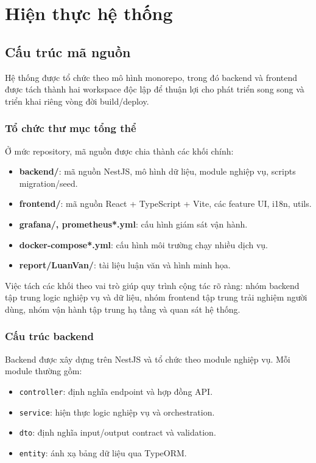 \section{Hiện thực hệ thống}

\subsection{Cấu trúc mã nguồn}
Hệ thống được tổ chức theo mô hình monorepo, trong đó backend và frontend được tách thành hai workspace độc lập để thuận lợi cho phát triển song song và triển khai riêng vòng đời build/deploy.

\subsubsection{Tổ chức thư mục tổng thể}
Ở mức repository, mã nguồn được chia thành các khối chính:
\begin{itemize}
	\item \textbf{backend/}: mã nguồn NestJS, mô hình dữ liệu, module nghiệp vụ, scripts migration/seed.
	\item \textbf{frontend/}: mã nguồn React + TypeScript + Vite, các feature UI, i18n, utils.
	\item \textbf{grafana/, prometheus*.yml}: cấu hình giám sát vận hành.
	\item \textbf{docker-compose*.yml}: cấu hình môi trường chạy nhiều dịch vụ.
	\item \textbf{report/LuanVan/}: tài liệu luận văn và hình minh họa.
\end{itemize}

Việc tách các khối theo vai trò giúp quy trình cộng tác rõ ràng: nhóm backend tập trung logic nghiệp vụ và dữ liệu, nhóm frontend tập trung trải nghiệm người dùng, nhóm vận hành tập trung hạ tầng và quan sát hệ thống.

\subsubsection{Cấu trúc backend}
Backend được xây dựng trên NestJS và tổ chức theo module nghiệp vụ. Mỗi module thường gồm:
\begin{itemize}
	\item \texttt{controller}: định nghĩa endpoint và hợp đồng API.
	\item \texttt{service}: hiện thực logic nghiệp vụ và orchestration.
	\item \texttt{dto}: định nghĩa input/output contract và validation.
	\item \texttt{entity}: ánh xạ bảng dữ liệu qua TypeORM.
\end{itemize}

